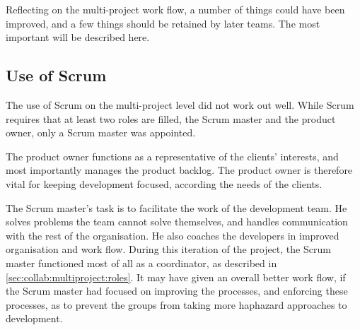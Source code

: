 Reflecting on the multi-project work flow, a number of things could have been improved, and a few things should be retained by later teams. The most important will be described here.

\subsection{Use of Scrum}
The use of Scrum on the multi-project level did not work out well. While Scrum requires that at least two roles are filled, the Scrum master and the product owner, only a Scrum master was appointed. 

The product owner functions as a representative of the clients' interests, and most importantly manages the product backlog. The product owner is therefore vital for keeping development focused, according the needs of the clients.

The Scrum master's task is to facilitate the work of the development team. He solves problems the team cannot solve themselves, and handles communication with the rest of the organisation. He also coaches the developers in improved organisation and work flow. During this iteration of the \giraf project, the Scrum master functioned most of all as a coordinator, as described in \cref{sec:collab:multiproject:roles}. It may have given an overall better work flow, if the Scrum master had focused on improving the processes, and enforcing these processes, as to prevent the groups from taking more haphazard approaches to development.

